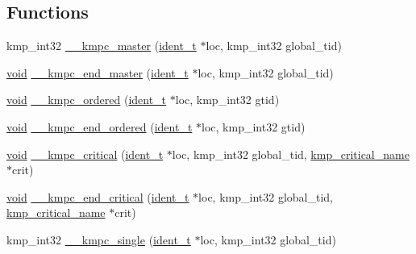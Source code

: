 \subsection*{Functions}
\begin{DoxyCompactItemize}
\item 
kmp\-\_\-int32 \hyperlink{group__WORK__SHARING_ga721f06c8017479ccc6cb46ae0552b597}{\-\_\-\-\_\-kmpc\-\_\-master} (\hyperlink{group__BASIC__TYPES_ga690fda6b92f039a72db263c6b4394ddb}{ident\-\_\-t} $\ast$loc, kmp\-\_\-int32 global\-\_\-tid)
\item 
\hyperlink{ittnotify__static_8h_af941d56e55e3c5465135b60c4d6343ed}{void} \hyperlink{group__WORK__SHARING_gaa290fe71698081e26ec234a234d2fdcc}{\-\_\-\-\_\-kmpc\-\_\-end\-\_\-master} (\hyperlink{group__BASIC__TYPES_ga690fda6b92f039a72db263c6b4394ddb}{ident\-\_\-t} $\ast$loc, kmp\-\_\-int32 global\-\_\-tid)
\item 
\hyperlink{ittnotify__static_8h_af941d56e55e3c5465135b60c4d6343ed}{void} \hyperlink{group__WORK__SHARING_gada4a8fc8b0a17d3109acdeaf2c9443ea}{\-\_\-\-\_\-kmpc\-\_\-ordered} (\hyperlink{group__BASIC__TYPES_ga690fda6b92f039a72db263c6b4394ddb}{ident\-\_\-t} $\ast$loc, kmp\-\_\-int32 gtid)
\item 
\hyperlink{ittnotify__static_8h_af941d56e55e3c5465135b60c4d6343ed}{void} \hyperlink{group__WORK__SHARING_ga06dfab09153c455fcaa609e97846b0d5}{\-\_\-\-\_\-kmpc\-\_\-end\-\_\-ordered} (\hyperlink{group__BASIC__TYPES_ga690fda6b92f039a72db263c6b4394ddb}{ident\-\_\-t} $\ast$loc, kmp\-\_\-int32 gtid)
\item 
\hyperlink{ittnotify__static_8h_af941d56e55e3c5465135b60c4d6343ed}{void} \hyperlink{group__WORK__SHARING_gafc4e7d07089576fe946c42777ef191cc}{\-\_\-\-\_\-kmpc\-\_\-critical} (\hyperlink{group__BASIC__TYPES_ga690fda6b92f039a72db263c6b4394ddb}{ident\-\_\-t} $\ast$loc, kmp\-\_\-int32 global\-\_\-tid, \hyperlink{kmp_8h_ac3fc9c92929f696709b178ffe0854839}{kmp\-\_\-critical\-\_\-name} $\ast$crit)
\item 
\hyperlink{ittnotify__static_8h_af941d56e55e3c5465135b60c4d6343ed}{void} \hyperlink{group__WORK__SHARING_ga134f0e9d82a69403d9e167dbbf7ae731}{\-\_\-\-\_\-kmpc\-\_\-end\-\_\-critical} (\hyperlink{group__BASIC__TYPES_ga690fda6b92f039a72db263c6b4394ddb}{ident\-\_\-t} $\ast$loc, kmp\-\_\-int32 global\-\_\-tid, \hyperlink{kmp_8h_ac3fc9c92929f696709b178ffe0854839}{kmp\-\_\-critical\-\_\-name} $\ast$crit)
\item 
kmp\-\_\-int32 \hyperlink{group__WORK__SHARING_ga794e820b3c076c766cef93bb414908cc}{\-\_\-\-\_\-kmpc\-\_\-single} (\hyperlink{group__BASIC__TYPES_ga690fda6b92f039a72db263c6b4394ddb}{ident\-\_\-t} $\ast$loc, kmp\-\_\-int32 global\-\_\-tid)

\end{DoxyCompactItemize}
